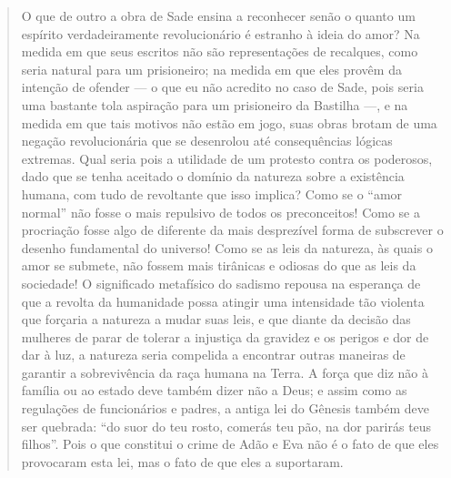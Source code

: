 \begin{quote} 
O que de outro a obra de Sade ensina a reconhecer senão o quanto um espírito verdadeiramente revolucionário é estranho à ideia do amor? Na medida em que seus escritos não são representações de recalques, como seria natural para um prisioneiro; na medida em que eles provêm da intenção de ofender --- o que eu não acredito no caso de Sade, pois seria uma bastante tola aspiração para um prisioneiro da Bastilha ---, e na medida em que tais motivos não estão em jogo, suas obras brotam de uma negação revolucionária que se desenrolou até consequências lógicas extremas. Qual seria pois a utilidade de um protesto contra os poderosos, dado que se tenha aceitado o domínio da natureza sobre a existência humana, com tudo de revoltante que isso implica? Como se o ``amor normal'' não fosse o mais repulsivo de todos os preconceitos! Como se a procriação fosse algo de diferente da mais desprezível forma de subscrever o desenho fundamental do universo! Como se as leis da natureza, às quais o amor se submete, não fossem mais tirânicas e odiosas do que as leis da sociedade! O significado metafísico do sadismo repousa na esperança de que a revolta da humanidade possa atingir uma intensidade tão violenta que forçaria a natureza a mudar suas leis, e que diante da decisão das mulheres de parar de tolerar a injustiça da gravidez e os perigos e dor de dar à luz, a natureza seria compelida a encontrar outras maneiras de garantir a sobrevivência da raça humana na Terra. A força que diz não à família ou ao estado deve também dizer não a Deus; e assim como as regulações de funcionários e padres, a antiga lei do Gênesis também deve ser quebrada: ``do suor do teu rosto, comerás teu pão, na dor parirás teus filhos''. Pois o que constitui o crime de Adão e Eva não é o fato de que eles provocaram esta lei, mas o fato de que eles a suportaram.
\end{quote}

